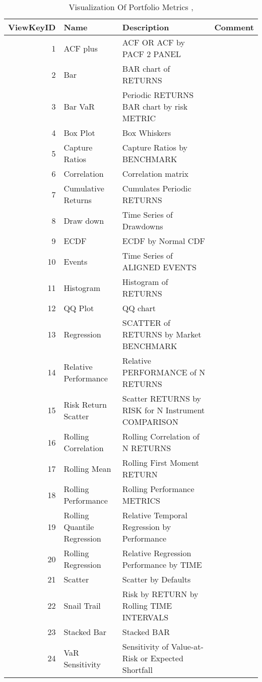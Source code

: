 \begin{table}
	\caption{Visualization Of Portfolio Metrics \cite{key100},\cite{key104}}
	\begin{tabular}{r|p{4cm}|ll}
		\hline
		ViewKeyID & Name & Description & Comment \\
		\hline
		1 & ACF plus & ACF OR ACF by PACF 2 PANEL & \\
		2 & Bar & BAR chart of RETURNS  & \\
		3 & Bar VaR & Periodic RETURNS BAR chart by risk METRIC & \\
		4 & Box Plot & Box Whiskers & \\
		5 & Capture Ratios & Capture Ratios by BENCHMARK  & \\
		6 & Correlation & Correlation matrix & \\
		7 & Cumulative Returns & Cumulates Periodic RETURNS  & \\
		8 & Draw down &	Time Series of Drawdowns  & \\
		9 & ECDF & ECDF by Normal CDF  & \\
		10 & Events & Time Series of ALIGNED EVENTS  & \\
		11 & Histogram	&  Histogram of RETURNS  & \\
		12 & QQ Plot & QQ chart  & \\
		\hline
		13 & Regression & SCATTER of RETURNS by Market BENCHMARK & \\
		14 & Relative Performance &	Relative PERFORMANCE of N RETURNS  & \\
		15 & Risk Return Scatter & Scatter RETURNS by RISK for N Instrument COMPARISON & \\
		\hline
		16 & Rolling Correlation &	Rolling Correlation of N RETURNS  & \\
		17 & Rolling Mean &	Rolling First Moment RETURN  & \\
		18 & Rolling Performance &	Rolling Performance METRICS & \\
		19 & Rolling Quantile Regression &	Relative Temporal Regression by Performance & \\
		20 & Rolling Regression & Relative Regression Performance by TIME  & \\
		\hline
		21 & Scatter &	Scatter by Defaults  & \\
		22 & Snail Trail &	Risk by RETURN by Rolling TIME INTERVALS  & \\
		23 & Stacked Bar &	Stacked BAR  & \\
		24 & VaR Sensitivity &	Sensitivity of Value-at-Risk or Expected Shortfall   & \\

\end{tabular}
\end{table}

